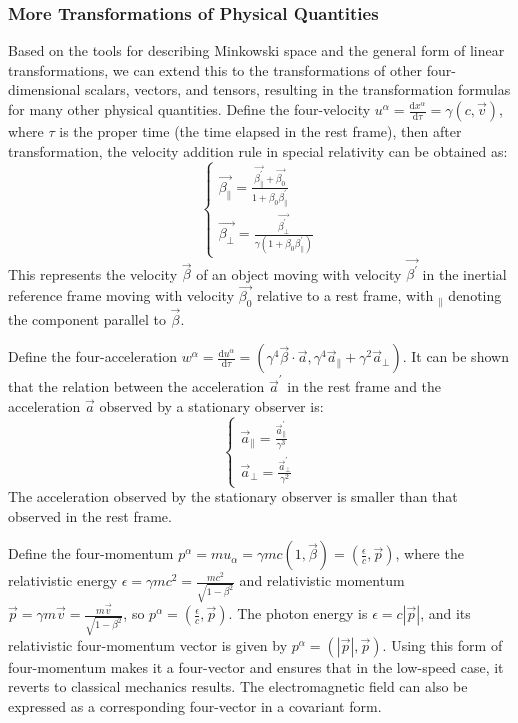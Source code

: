 \documentclass{article}
\begin{document}
\subsubsection*{More Transformations of Physical Quantities}

Based on the tools for describing Minkowski space and the general form of linear transformations, we can extend this to the transformations of other four-dimensional scalars, vectors, and tensors, resulting in the transformation formulas for many other physical quantities. Define the four-velocity $u^{\alpha} = \frac{\mathrm{d} x^{\alpha}} {\mathrm{d} \tau} = \gamma (c, \vec{v})$, where $\tau$ is the proper time (the time elapsed in the rest frame), then after transformation, the velocity addition rule in special relativity can be obtained as: 
$$ \begin{cases} 
\vec{\beta_{\parallel}} = \frac{\vec{\beta_{\parallel}^{'}} + \vec{\beta_0}} {1 + \beta_0 \beta_{\parallel}^{'}} \\
\vec{\beta_{\perp}} = \frac{\vec{\beta_{\perp}^{'}}} {\gamma (1 + \beta_0 \beta_{\parallel}^{'})} 
\end{cases} $$ 
This represents the velocity $\vec{\beta}$ of an object moving with velocity $\vec{\beta^{'}}$ in the inertial reference frame moving with velocity $\vec{\beta_0}$ relative to a rest frame, with $_{\parallel}$ denoting the component parallel to $\vec{\beta}$. 

Define the four-acceleration $w^{\alpha} = \frac{\mathrm{d} u^{\alpha}} {\mathrm{d} \tau} = (\gamma^4 \vec{\beta} \cdot \vec{a}, \gamma^4 \vec{a}_{\parallel} + \gamma^2 \vec{a}_{\perp})$. It can be shown that the relation between the acceleration $\vec{a}^{'}$ in the rest frame and the acceleration $\vec{a}$ observed by a stationary observer is:
$$ \begin{cases} 
\vec{a}_{\parallel} = \frac{\vec{a}^{'}_{\parallel}} {\gamma^3} \\
\vec{a}_{\perp} = \frac{\vec{a}^{'}_{\perp}} {\gamma^2} 
\end{cases} $$ 
The acceleration observed by the stationary observer is smaller than that observed in the rest frame. 

Define the four-momentum $p^{\alpha} = m u_{\alpha} = \gamma mc (1, \vec{\beta}) = (\frac{\epsilon}{c}, \vec{p})$, where the relativistic energy $\epsilon = \gamma mc^2 = \frac{mc^2} {\sqrt{1 - \beta^2}}$ and relativistic momentum $\vec{p} = \gamma m \vec{v} = \frac{m \vec{v}} {\sqrt{1 - \beta^2}}$, so $p^{\alpha} = (\frac{\epsilon}{c} , \vec{p})$. The photon energy is $\epsilon = c|\vec{p}|$, and its relativistic four-momentum vector is given by $p^{\alpha} = (|\vec{p}|, \vec{p})$. Using this form of four-momentum makes it a four-vector and ensures that in the low-speed case, it reverts to classical mechanics results. The electromagnetic field can also be expressed as a corresponding four-vector in a covariant form. 
\end{document}
